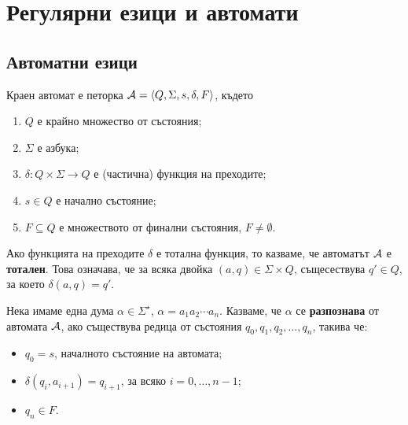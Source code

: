 \chapter{Регулярни езици и автомати}

\section{Автоматни езици}

\begin{dfn}
  Краен автомат е петорка $\mathcal{A} = \langle{Q,\Sigma,s,\delta,F}\rangle$, където
  \begin{enumerate}[1)]
  \item
    $Q$ е крайно множество от състояния;
  \item
    $\Sigma$ е азбука;
  \item
    $\delta:Q\times\Sigma\to Q$ е (частична) функция на преходите;
  \item
    $s\in Q$ е начално състояние;
  \item
    $F\subseteq Q$ е множеството от финални състояния, $F \neq \emptyset$.
  \end{enumerate}
\end{dfn}

Ако функцията на преходите $\delta$ е тотална функция, то казваме, 
че автоматът $\mathcal{A}$ е {\bf тотален}. Това означава, че за всяка двойка $(a,q) \in \Sigma\times Q$,
същесествува $q' \in Q$, за което $\delta(a,q) = q'$.

Нека имаме една дума $\alpha \in \Sigma^\star$, $\alpha = a_1a_2\cdots a_n$.
Казваме, че $\alpha$ се {\bf разпознава} от автомата $\mathcal{A}$, ако
съществува редица от състояния $q_0,q_1,q_2,\dots,q_n$, такива че:
\begin{itemize}
\item
  $q_0 = s$, началното състояние на автомата;
\item
  $\delta(q_i,a_{i+1}) = q_{i+1}$, за всяко $i = 0, \dots, n-1$;
\item
  $q_n \in F$.
\end{itemize}


